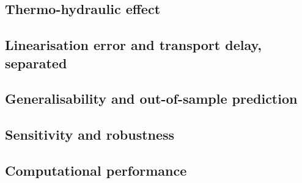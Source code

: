\documentclass[a4paper,fleqn]{cas-dc}
\begin{document}
\subsection{Thermo-hydraulic effect}


\subsection{Linearisation error and transport delay, separated}


\subsection{Generalisability and out-of-sample prediction}



\subsection{Sensitivity and robustness}



\subsection{Computational performance}

\end{document}
